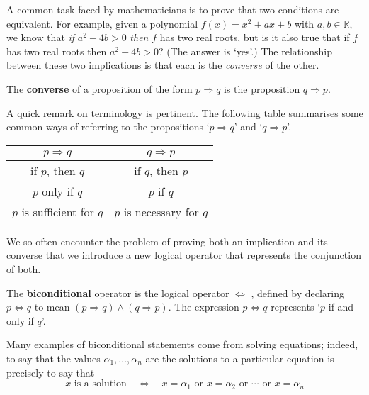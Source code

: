 A common task faced by mathematicians is to prove that two conditions are equivalent. For example, given a polynomial $f(x) = x^2+ax+b$ with $a,b \in \mathbb{R}$, we know that \textit{if} $a^2-4b>0$ \textit{then} $f$ has two real roots, but is it also true that if $f$ has two real roots then $a^2-4b>0$? (The answer is `yes'.) The relationship between these two implications is that each is the \textit{converse} of the other.

\begin{definition}
\label{defConverse}
The \textbf{converse} of a proposition of the form $p \Rightarrow q$ is the proposition $q \Rightarrow p$.
\end{definition}

A quick remark on terminology is pertinent. The following table summarises some common ways of referring to the propositions `$p \Rightarrow q$' and `$q \Rightarrow p$'.

\begin{center}
\begin{tabular}{c|c}
$p \Rightarrow q$ & $q \Rightarrow p$ \\ \hline
if $p$, then $q$ & if $q$, then $p$ \\
$p$ only if $q$ & $p$ if $q$ \\
$p$ is sufficient for $q$ & $p$ is necessary for $q$
\end{tabular}
\end{center}

We so often encounter the problem of proving both an implication and its converse that we introduce a new logical operator that represents the conjunction of both.

\begin{definition}
\label{defBiconditional}
The \textbf{biconditional} operator is the logical operator $\Leftrightarrow$ , defined by declaring $p \Leftrightarrow q$ to mean $(p \Rightarrow q) \wedge (q \Rightarrow p)$. The expression $p \Leftrightarrow q$ represents `$p$ if and only if $q$'.
\end{definition}

Many examples of biconditional statements come from solving equations; indeed, to say that the values $\alpha_1,\dots,\alpha_n$ are the solutions to a particular equation is precisely to say that
\[
x \text{ is a solution} \quad \Leftrightarrow \quad x = \alpha_1 \text{ or } x = \alpha_2 \text{ or } \cdots \text{ or } x = \alpha_n
\]

